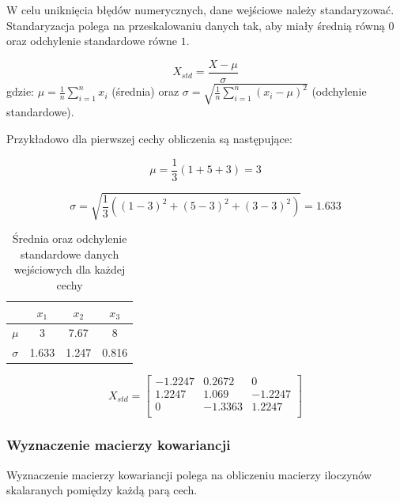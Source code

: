 \documentclass{article}
\begin{document}
W celu uniknięcia błędów numerycznych, dane wejściowe należy
standaryzować. Standaryzacja polega na przeskalowaniu danych
tak, aby miały średnią równą $0$ oraz odchylenie standardowe
równe $1$.

\begin{equation}
    X_{std} = \frac{X - \mu}{\sigma}
\end{equation}
gdzie: $\mu = \frac{1}{n} \sum_{i=1}^{n} x_i$ (średnia) oraz $\sigma = \sqrt{\frac{1}{n} \sum_{i=1}^{n} (x_i - \mu)^2}$
(odchylenie standardowe).

Przykładowo dla pierwszej cechy obliczenia są następujące:

\begin{equation*}
    \mu = \frac{1}{3} (1 + 5 + 3) = 3
\end{equation*}

\begin{equation*}
    \sigma = \sqrt{\frac{1}{3} ((1 - 3)^2 + (5 - 3)^2 + (3 - 3)^2)} = 1.633
\end{equation*}

\begin{table}[H]
    \centering
    \begin{tabular}{|c|c|c|c|}
        \hline
        & $x_1$ & $x_2$ & $x_3$ \\
        \hline
        $\mu$ & 3 & 7.67 & 8 \\
        \hline
        $\sigma$ & 1.633 & 1.247 & 0.816 \\
        \hline
    \end{tabular}
    \caption{Średnia oraz odchylenie standardowe danych wejściowych dla każdej cechy}
\end{table}

\begin{equation}
    X_{std} = 
    \begin{bmatrix}
        -1.2247 & 0.2672 & 0 \\
        1.2247 & 1.069 & -1.2247 \\
        0 & -1.3363 & 1.2247 \\
    \end{bmatrix}
\end{equation}

\subsubsection*{Wyznaczenie macierzy kowariancji}

Wyznaczenie macierzy kowariancji polega na obliczeniu
macierzy iloczynów skalaranych pomiędzy każdą parą cech.
\end{document}
